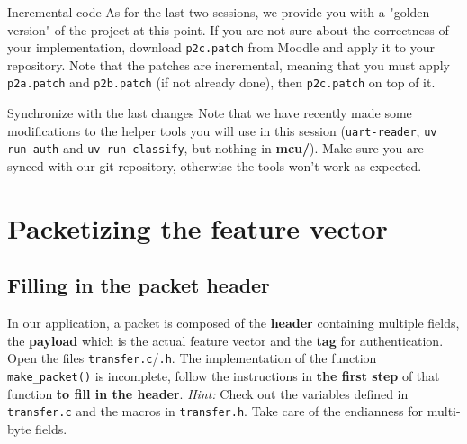 \begin{bclogo}[couleur = gray!20, arrondi = 0.2, logo=\bcattention]{Incremental code}
As for the last two sessions, we provide you with a "golden version" of the project at this point. If you are not sure about the correctness of your implementation, download \texttt{p2c.patch} from Moodle and apply it to your repository. Note that the patches are incremental, meaning that you must apply \texttt{p2a.patch} and \texttt{p2b.patch} (if not already done), then \texttt{p2c.patch} on top of it.
\end{bclogo}

\begin{bclogo}[couleur = gray!20, arrondi = 0.2, logo=\bcattention]{Synchronize with the last changes}
Note that we have recently made some modifications to the helper tools you will use in this session (\texttt{uart-reader}, \texttt{uv run auth} and \texttt{uv run classify}, but nothing in \textbf{mcu/}). Make sure you are synced with our git repository, otherwise the tools won't work as expected.
\end{bclogo}

\section{Packetizing the feature vector}

\subsection{Filling in the packet header}

In our application, a packet is composed of the \textbf{header} containing multiple fields, the \textbf{payload} which is the actual feature vector and the \textbf{tag} for authentication. Open the files \texttt{transfer.c}/\texttt{.h}. The implementation of the function \texttt{make\_packet()} is incomplete, follow the instructions in \textbf{the first step} of that function \textbf{to fill in the header}. \textit{Hint:} Check out the variables defined in \texttt{transfer.c} and the macros in \texttt{transfer.h}. Take care of the endianness for multi-byte fields.

